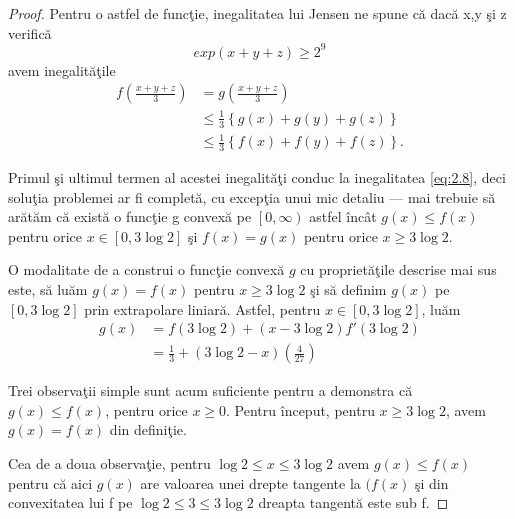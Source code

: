 \documentclass[a4paper,12pt,oneside]{report}
\begin{document}
\begin{proof}
Pentru o astfel de func\c{t}ie, inegalitatea lui Jensen ne spune  c\u{a} dac\u{a} x,y \c{s}i z verific\u{a} \[exp \left ( x + y + z \right )\geq  2^{9} \] avem inegalit\u{a}\c{t}ile
\begin{displaymath}
\begin{split}
  f\left ( \frac{x + y + z}{3} \right ) &= g\left ( \frac{x + y + z}{3} \right )\\
   &\leq  \frac{1}{3}\left \{ g\left ( x \right ) + g\left ( y \right ) + g\left ( z \right ) \right \} \\ & \leq  \frac{1}{3}\left \{ f\left ( x \right ) + f\left ( y \right ) + f\left ( z \right ) \right \}.
  \end{split}
\end{displaymath}

Primul \c{s}i ultimul termen al acestei inegalit\u{a}\c{t}i conduc la inegalitatea \ref{eq:2.8}, deci solu\c{t}ia problemei ar fi complet\u{a}, cu excep\c{t}ia unui mic detaliu — mai trebuie s\u{a} ar\u{a}t\u{a}m c\u{a} exist\u{a} o func\c{t}ie  g convex\u{a} pe \( \left [ 0 , \infty  \right ) \) astfel \^{i}nc\^{a}t  \(g\left ( x \right ) \leq  f\left ( x \right )\) pentru orice  \(x \in \left [ 0 , 3\log 2 \right ]\) \c{s}i \( f\left ( x \right ) = g\left ( x \right )\) pentru orice \( x \geq 3\log 2\).

O modalitate de a construi o func\c{t}ie convex\u{a} \(g\) cu propriet\u{a}\c{t}ile  descrise mai sus este, s\u{a} lu\u{a}m  \(g\left ( x \right ) = f\left ( x \right )\) pentru \(x \geq  3\log2\) \c{s}i s\u{a} definim \(g\left ( x \right )\) pe \(\left [ 0 , 3\log 2 \right ]\) prin extrapolare liniar\u{a}. Astfel, pentru \(x\in \left [ 0 , 3\log 2 \right ]\), lu\u{a}m
\begin{equation} \nonumber
    \begin{split}
     g\left ( x \right )  &      = f\left ( 3\log 2 \right ) + \left ( x - 3\log 2 \right ){f}'\left ( 3\log2 \right ) \\ &  = \frac{1}{3} + \left ( 3\log2 - x  \right )\left ( \frac{4}{27} \right )
    \end{split}
\end{equation}

Trei observa\c{t}ii simple sunt acum suficiente pentru a demonstra c\u{a} \(g\left ( x \right )\leq f\left ( x \right )\), pentru orice \(x\geq 0\). Pentru \^{i}nceput, pentru \(x\geq 3\log 2\), avem \(g\left ( x \right ) = f\left ( x \right )\) din defini\c{t}ie.

Cea de a doua observa\c{t}ie, pentru \(\log 2 \leq  x \leq  3\log 2\) avem  \(g( x )\leq f\left ( x \right ) \) pentru c\u{a} aici  \(g\left ( x \right )\) are valoarea unei drepte tangente la \((f\left ( x \right )\) \c{s}i din convexitatea lui f pe \(\log 2 \leq  3 \leq 3\log 2\) dreapta tangent\u{a} este sub f.


\end{proof}
\end{document}
